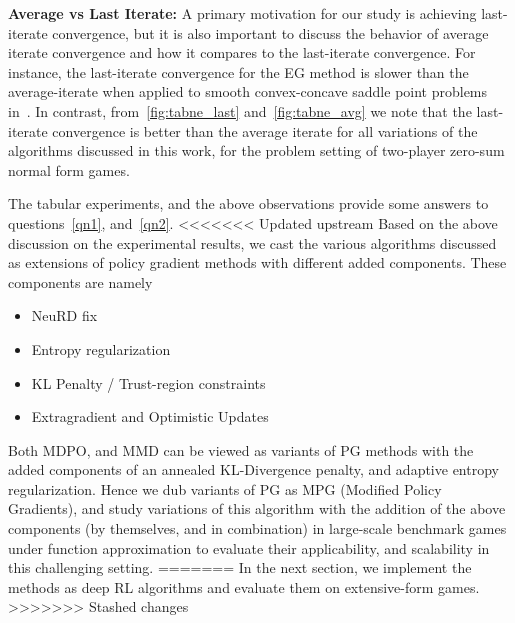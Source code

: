 \textbf{Average vs Last Iterate:}
A primary motivation for our study is achieving last-iterate convergence, but it is also important
to discuss the behavior of average iterate convergence and how it compares to the last-iterate
convergence.
For instance, the last-iterate convergence for the EG method is slower than the average-iterate
when applied to smooth convex-concave saddle point problems in~\cite{golowichLast2020}.
In contrast, from~\ref{fig:tabne_last} and~\ref{fig:tabne_avg} we note that the last-iterate
convergence is better than the average iterate for all variations of the algorithms discussed in
this work, for the problem setting of two-player zero-sum normal form games.

The tabular experiments, and the above observations provide some answers to questions~\ref{qn1},
and~\ref{qn2}.
<<<<<<< Updated upstream
Based on the above discussion on the experimental results, we cast the various algorithms discussed
as extensions of policy gradient methods with different added components.
These components are namely
\begin{itemize}
	\item NeuRD fix
	\item Entropy regularization
	\item KL
	      Penalty / Trust-region constraints
    	\item Extragradient and Optimistic Updates
\end{itemize}

Both MDPO, and MMD can be viewed as variants of PG methods with the added
components of an annealed KL-Divergence penalty, and adaptive entropy regularization.
Hence we dub variants of PG as MPG (Modified Policy Gradients), and study variations of this
algorithm with the addition of the above components (by themselves, and in combination) in
large-scale benchmark games under function approximation to evaluate their applicability, and
scalability in this challenging setting.
=======
In the next section, we implement the methods as deep RL algorithms and evaluate them on
extensive-form games.
>>>>>>> Stashed changes
